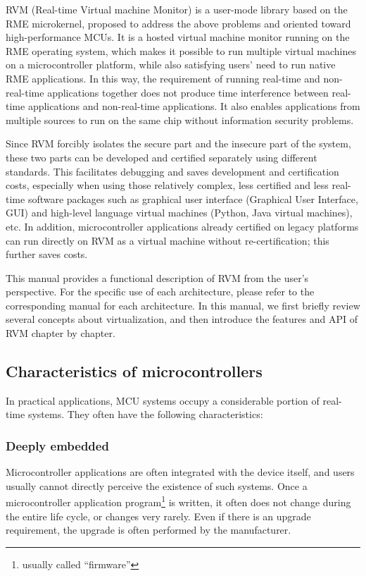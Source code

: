 RVM (Real-time Virtual machine
Monitor) is a user-mode library based on the RME microkernel, proposed to address the above problems and oriented toward high-performance MCUs. It is a hosted virtual machine monitor running on the RME operating system, which makes it possible to run multiple virtual machines on a microcontroller platform, while also satisfying users' need to run native RME applications. In this way, the requirement of running real-time and non-real-time applications together does not produce time interference between real-time applications and non-real-time applications. It also enables applications from multiple sources to run on the same chip without information security problems.

Since RVM forcibly isolates the secure part and the insecure part of the system, these two parts can be developed and certified separately using different standards. This facilitates debugging and saves development and certification costs, especially when using those relatively complex, less certified and less real-time software packages such as graphical
user
interface (Graphical
User
Interface, GUI) and high-level language virtual machines (Python, Java virtual machines), etc. In addition, microcontroller applications already certified on legacy platforms can run directly on RVM as a virtual machine without re-certification; this further saves costs.

This manual provides a functional description of RVM from the user's perspective. For the specific use of each architecture, please refer to the corresponding manual for each architecture. In this manual, we first briefly review several concepts about virtualization, and then introduce the features and API of RVM chapter by chapter.

\subsection{Characteristics of microcontrollers}\label{subsec:1-1-1}

In practical applications, MCU systems occupy a considerable portion of real-time systems. They often have the following characteristics:

\subsubsection{Deeply embedded}\label{subsubsec:1-1-1-1}

Microcontroller applications are often integrated with the device itself, and users usually cannot directly perceive the existence of such systems. Once a microcontroller application program\footnote{usually called ``firmware''} is written, it often does not change during the entire life cycle, or changes very rarely. Even if there is an upgrade requirement, the upgrade is often performed by the manufacturer.

